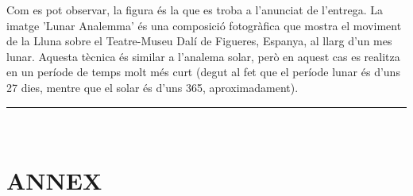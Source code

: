 \documentclass[a4paper, 11pt]{article}
\begin{document}
\vspace{2mm}

\noindent Com es pot observar, la figura és la que es troba a l'anunciat de l'entrega. La imatge 'Lunar Analemma' és una composició fotogràfica que mostra el moviment de la Lluna sobre el Teatre-Museu Dalí de Figueres, Espanya, al llarg d'un mes lunar. Aquesta tècnica és similar a l'analema solar, però en aquest cas es realitza en un període de temps molt més curt (degut al fet que el període lunar és d'uns 27 dies, mentre que el solar és d'uns 365, aproximadament).


\vspace{10mm}
\hrule\
\vspace{5mm}


\newpage
\section*{ANNEX}
\end{document}
